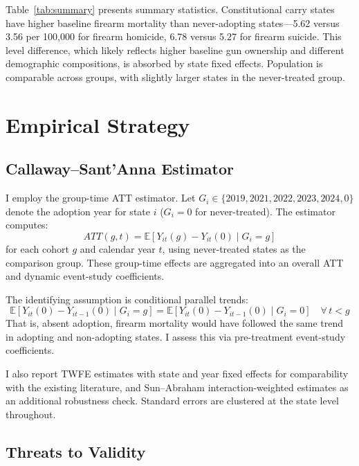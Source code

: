 \documentclass[12pt]{article}
\newcommand{\E}{\mathbb{E}}
\begin{document}
Table~\ref{tab:summary} presents summary statistics. Constitutional carry states have higher baseline firearm mortality than never-adopting states---5.62 versus 3.56 per 100,000 for firearm homicide, 6.78 versus 5.27 for firearm suicide. This level difference, which likely reflects higher baseline gun ownership and different demographic compositions, is absorbed by state fixed effects. Population is comparable across groups, with slightly larger states in the never-treated group.

\section{Empirical Strategy}
\label{sec:strategy}

\subsection{Callaway--Sant'Anna Estimator}

I employ the \citet{callaway2021} group-time ATT estimator. Let $G_i \in \{2019, 2021, 2022, 2023, 2024, 0\}$ denote the adoption year for state $i$ ($G_i = 0$ for never-treated). The estimator computes:
\begin{equation}
ATT(g,t) = \E[Y_{it}(g) - Y_{it}(0) \mid G_i = g]
\end{equation}
for each cohort $g$ and calendar year $t$, using never-treated states as the comparison group. These group-time effects are aggregated into an overall ATT and dynamic event-study coefficients.

The identifying assumption is conditional parallel trends:
\begin{equation}
\E[Y_{it}(0) - Y_{it-1}(0) \mid G_i = g] = \E[Y_{it}(0) - Y_{it-1}(0) \mid G_i = 0] \quad \forall\, t < g
\end{equation}
That is, absent adoption, firearm mortality would have followed the same trend in adopting and non-adopting states. I assess this via pre-treatment event-study coefficients.

I also report TWFE estimates with state and year fixed effects for comparability with the existing literature, and Sun--Abraham interaction-weighted estimates \citep{sunab2021} as an additional robustness check. Standard errors are clustered at the state level throughout.

\subsection{Threats to Validity}
\end{document}
